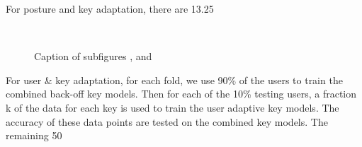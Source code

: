 \documentclass{sigchi}
\begin{document}
For posture and key adaptation, there are 13.25%

\begin{figure}[tb]
	\centering
	 ~
	\caption[Optional caption for list of figures]{Caption of subfigures
	,  and }
	\label{fig:subfigureExample}
\end{figure}

For user & key adaptation, for each fold, we use 90\% of the users to train the
combined back-off key models. Then for each of the 10\% testing users,  a
fraction k of the data for each key is used to train the user adaptive key models. The accuracy of these data points are tested on the combined key models. The remaining 50%
\end{document}
